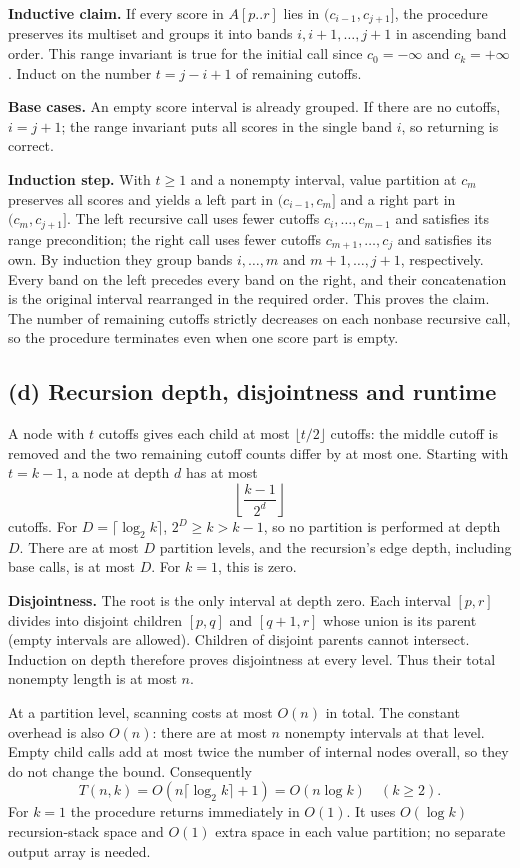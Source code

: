 \documentclass[11pt,a4paper]{article}
\newcommand{\parttitle}[1]{\Needspace{10\baselineskip}\subsection*{#1}}
\begin{document}
\textbf{Inductive claim.} If every score in $A[p..r]$ lies in $(c_{i-1},c_{j+1}]$, the procedure preserves its multiset and groups it into bands $i,i+1,\ldots,j+1$ in ascending band order. This range invariant is true for the initial call since $c_0=-\infty$ and $c_k=+\infty$. Induct on the number $t=j-i+1$ of remaining cutoffs.

\textbf{Base cases.} An empty score interval is already grouped. If there are no cutoffs, $i=j+1$; the range invariant puts all scores in the single band $i$, so returning is correct.

\textbf{Induction step.} With $t\ge1$ and a nonempty interval, value partition at $c_m$ preserves all scores and yields a left part in $(c_{i-1},c_m]$ and a right part in $(c_m,c_{j+1}]$. The left recursive call uses fewer cutoffs $c_i,\ldots,c_{m-1}$ and satisfies its range precondition; the right call uses fewer cutoffs $c_{m+1},\ldots,c_j$ and satisfies its own. By induction they group bands $i,\ldots,m$ and $m+1,\ldots,j+1$, respectively. Every band on the left precedes every band on the right, and their concatenation is the original interval rearranged in the required order. This proves the claim. The number of remaining cutoffs strictly decreases on each nonbase recursive call, so the procedure terminates even when one score part is empty.

\parttitle{(d) Recursion depth, disjointness and runtime}
A node with $t$ cutoffs gives each child at most $\lfloor t/2\rfloor$ cutoffs: the middle cutoff is removed and the two remaining cutoff counts differ by at most one. Starting with $t=k-1$, a node at depth $d$ has at most
\[
\left\lfloor\frac{k-1}{2^d}\right\rfloor
\]
cutoffs. For $D=\lceil\log_2 k\rceil$, $2^D\ge k>k-1$, so no partition is performed at depth $D$. There are at most $D$ partition levels, and the recursion's edge depth, including base calls, is at most $D$. For $k=1$, this is zero.

\textbf{Disjointness.} The root is the only interval at depth zero. Each interval $[p,r]$ divides into disjoint children $[p,q]$ and $[q+1,r]$ whose union is its parent (empty intervals are allowed). Children of disjoint parents cannot intersect. Induction on depth therefore proves disjointness at every level. Thus their total nonempty length is at most $n$.

At a partition level, scanning costs at most $O(n)$ in total. The constant overhead is also $O(n)$: there are at most $n$ nonempty intervals at that level. Empty child calls add at most twice the number of internal nodes overall, so they do not change the bound. Consequently
\[
\boxed{T(n,k)=O(n\lceil\log_2 k\rceil+1)
=O(n\log k)\quad(k\ge2).}
\]
For $k=1$ the procedure returns immediately in $O(1)$. It uses $O(\log k)$ recursion-stack space and $O(1)$ extra space in each value partition; no separate output array is needed.
\end{document}
